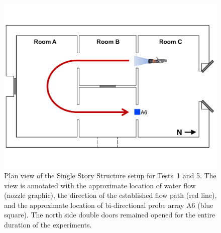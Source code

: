 \documentclass[12pt,oneside]{book}
\begin{document}
\begin{figure}[!ht]
	\includegraphics[width=\columnwidth]{../Figures/Floor_Plans/Specific_Tests/East_Hose_Test_Annotated}
	\caption[Plan view of the Single Story Structure setup for Tests~1 and 5.]{Plan view of the Single Story Structure setup for Tests~1 and 5. The view is annotated with the approximate location of water flow (nozzle graphic), the direction of the established flow path (red line), and the approximate location of bi-directional probe array A6 (blue square). The north side double doors remained opened for the entire duration of the experiments.}
	\label{fig:east_setup}
\end{figure}
\FloatBarrier
\end{document}
